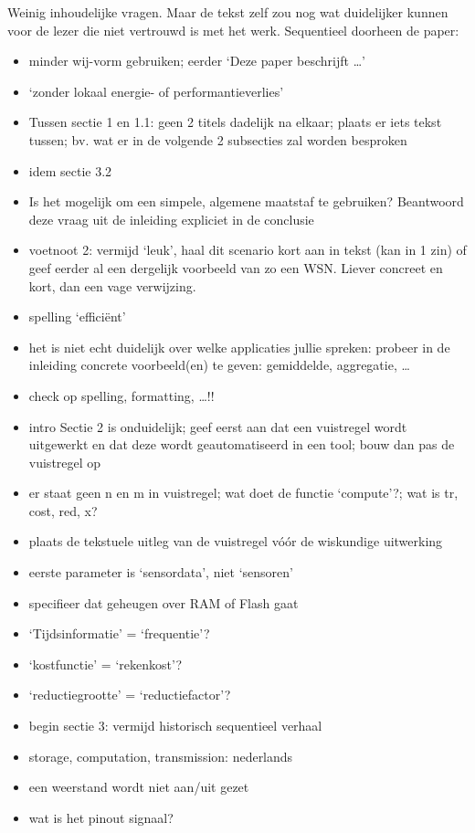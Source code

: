 \documentclass[11pt]{article}
\begin{document}
Weinig inhoudelijke vragen. Maar de tekst zelf zou nog wat duidelijker kunnen voor de lezer die niet vertrouwd is met het werk. Sequentieel doorheen de paper:
\begin{itemize}
\item minder wij-vorm gebruiken; eerder ‘Deze paper beschrijft …’
\item ‘zonder lokaal energie- of performantieverlies’
\item Tussen sectie 1 en 1.1: geen 2 titels dadelijk na elkaar; plaats er iets tekst tussen; bv. wat er in de volgende 2 subsecties zal worden besproken
\item idem sectie 3.2
\item Is het mogelijk om een simpele, algemene maatstaf te gebruiken? Beantwoord deze vraag uit de inleiding expliciet in de conclusie
\item voetnoot 2: vermijd ‘leuk’, haal dit scenario kort aan in tekst (kan in 1 zin) of geef eerder al een dergelijk voorbeeld van zo een WSN. Liever concreet en kort, dan een vage verwijzing.
\item spelling ‘efficiënt’
\item het is niet echt duidelijk over welke applicaties jullie spreken: probeer in de inleiding concrete voorbeeld(en) te geven: gemiddelde, aggregatie, …
\item check op spelling, formatting, …!!
\item intro Sectie 2 is onduidelijk; geef eerst aan dat een vuistregel wordt uitgewerkt en dat deze wordt geautomatiseerd in een tool; bouw dan pas de vuistregel op
\item er staat geen n en m in vuistregel; wat doet de functie ‘compute’?; wat is tr, cost, red, x?
\item plaats de tekstuele uitleg van de vuistregel vóór de wiskundige uitwerking
\item eerste parameter is ‘sensordata’, niet ‘sensoren’
\item specifieer dat geheugen over RAM of Flash gaat
\item ‘Tijdsinformatie’ = ‘frequentie’?
\item ‘kostfunctie’ = ‘rekenkost’?
\item ‘reductiegrootte’ = ‘reductiefactor’?
\item begin sectie 3: vermijd historisch sequentieel verhaal
\item storage, computation, transmission: nederlands
\item een weerstand wordt niet aan/uit gezet
\item wat is het pinout signaal?

\end{itemize}
\end{document}
